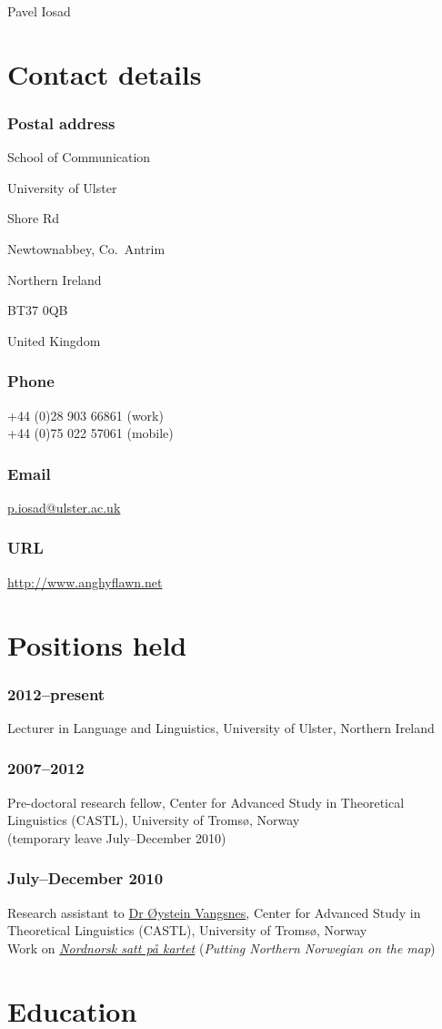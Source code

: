 \documentclass[a4paper,11pt]{article}
\newlength\blockwidth
\newcommand\cvitem[1]{\hspace*{\blockwidth}\begin{minipage}[t]{\linewidth-\blockwidth}
#1
\end{minipage}\par}
\newcommand{\block}[2]{\subsubsection{#1}\cvitem{#2}}
\begin{document}
\thispagestyle{plain}
{\Huge{} Pavel Iosad}\\[\baselineskip]

\section{Contact details}

\raggedcolumns

\begin{multicols}{2}
\block{Postal address}{School of Communication\par
University of Ulster\par
Shore Rd\par
Newtownabbey, Co.~Antrim\par
Northern Ireland\par
BT37 0QB\par
United Kingdom}
\block{Phone}{+44 (0)28 903 66861 (work)\\
+44 (0)75 022 57061 (mobile)}
\block{Email}{\href{mailto:p.iosad@ulster.ac.uk}{p.iosad@ulster.ac.uk}}
\block{URL}{\href{http://www.anghyflawn.net}{http://www.anghyflawn.net}}
\end{multicols}

\section{Positions held}
\block{2012--present}{Lecturer in Language and Linguistics, University of Ulster, Northern Ireland}
\block{2007--2012}{Pre-doctoral research fellow, Center for Advanced Study in Theoretical Linguistics (CASTL), University of Tromsø, Norway\\
(temporary leave July--December 2010)}
\block{July--December 2010}{Research assistant to \href{http://www.hum.uit.no/a/vangsnes}{Dr Øystein Vangsnes}, Center for Advanced Study in Theoretical Linguistics (CASTL), University of Tromsø, Norway\\
Work on \href{http://nordnorsk.uit.no/}{\textit{Nordnorsk satt på kartet}} (\textit{Putting Northern Norwegian on the map})}

\section{Education}
\end{document}
